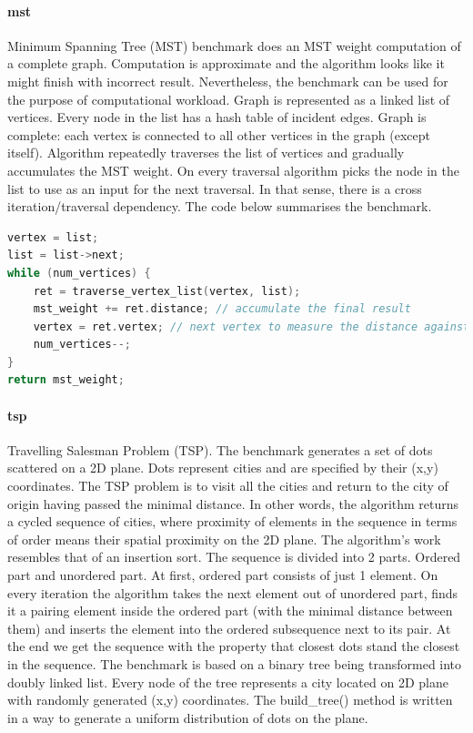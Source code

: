 \paragraph{mst} Minimum Spanning Tree (MST) benchmark does an MST weight computation of a complete graph. Computation is approximate and the algorithm looks like it might finish with incorrect result. Nevertheless, the benchmark can be used for the purpose of computational workload. Graph is represented as a linked list of vertices. Every node in the list has a hash table of incident edges. Graph is complete: each vertex is connected to all other vertices in the graph (except itself). Algorithm repeatedly traverses the list of vertices and gradually accumulates the MST weight. On every traversal algorithm picks the node in the list to use as an input for the next traversal. In that sense, there is a cross iteration/traversal dependency. The code below summarises the benchmark.\newline\null
\begin{minipage}[t]{\linewidth}
\begin{lstlisting}[caption={The main algorithm of mst benchmark.},label={lst:mst_code},language=C]
vertex = list;
list = list->next;
while (num_vertices) {
    ret = traverse_vertex_list(vertex, list);
    mst_weight += ret.distance; // accumulate the final result
    vertex = ret.vertex; // next vertex to measure the distance against
    num_vertices--;
}
return mst_weight;
\end{lstlisting}
\end{minipage}
\paragraph{tsp} Travelling Salesman Problem (TSP). The benchmark generates a set of dots scattered on a 2D plane. Dots represent cities and are specified by their (x,y) coordinates. The TSP problem is to visit all the cities and return to the city of origin having passed the minimal distance. In other words, the algorithm returns a cycled sequence of cities, where proximity of elements in the sequence in terms of order means their spatial proximity on the 2D plane. The algorithm’s work resembles that of an insertion sort. The sequence is divided into 2 parts. Ordered part and unordered part. At first, ordered part consists of just 1 element. On every iteration the algorithm takes the next element out of unordered part, finds it a pairing element inside the ordered part (with the minimal distance between them) and inserts the element into the ordered subsequence next to its pair. At the end we get the sequence with the property that closest dots stand the closest in the sequence. The benchmark is based on a binary tree being transformed into doubly linked list. Every node of the tree represents a city located on 2D plane with randomly generated (x,y) coordinates. The build\_tree() method is written in a way to generate a uniform distribution of dots on the plane.

%